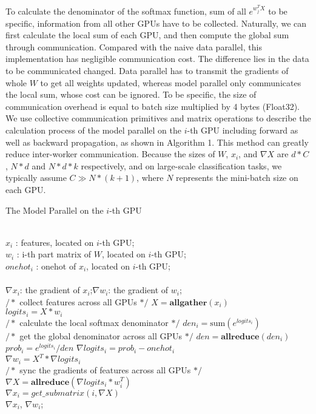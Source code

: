 \documentclass[letterpaper]{article} \usepackage{style/aaai21}  \usepackage{times}  \usepackage{helvet} \usepackage{courier}  \usepackage[hyphens]{url}  \usepackage{graphicx} \usepackage{color}
\begin{document}
To calculate the denominator of the softmax function, sum of all $e^{w_{j}^TX}$ to be specific, information from all other GPUs have to be collected. Naturally, we can first calculate the local sum of each GPU, and then compute the global sum through communication. Compared with the naive data parallel, this implementation has negligible communication cost. The difference lies in the data to be communicated changed. Data parallel has to transmit the gradients of whole $W$ to get all weights updated, whereas model parallel only communicates the local sum, whose cost can be ignored. To be specific, the size of communication overhead is equal to batch size multiplied by 4 bytes (Float32). We use collective communication primitives and matrix operations to describe the calculation process of the model parallel on the $i$-th GPU including forward as well as backward propagation, as shown in Algorithm 1. This method can greatly reduce inter-worker communication. Because the sizes of $W$, $x_i$, and $\nabla {X}$ are $d*C$, $N*d$ and $N*d*k$ respectively, and on large-scale classification tasks, we typically assume $C \gg N*(k+1)$, where $N$ represents the mini-batch size on each GPU.
\begin{algorithm}[t]
 \caption{The Model Parallel on the $i$-th GPU}
 \begin{algorithmic}[1]
  \REQUIRE ~~\\ 
  	{$ x_i$}  : features, located on $i$-th GPU;                \\
	{$ w_i$}  : i-th part matrix of $W$, located on $i$-th GPU;          \\
  	{$ onehot_i$}  : onehot of $x_i$, located on $i$-th GPU;   \\
  \ENSURE ~~\\ 
  	$\nabla {x_i}$: the gradient of $x_i$;\quad $\nabla {w_i}$: the gradient of $w_i$;\\
    \STATE $/*$ collect features across all GPUs $*/$
    \STATE $   {X} = \textbf{allgather}(x_i)$  \\
    \STATE $   {logits_i = X*w_{i}}$ \\  
    \STATE $/*$ calculate the local softmax denominator $*/$
    \STATE $   den_i = \text{sum} (e^{logits_i})$ \\  
    \STATE $/*$ get the global denominator across all GPUs $*/$
    \STATE $   den = \textbf{allreduce}(den_i)$\\ \STATE $   prob_i = e^{logits_i} / {den} $ 
    \STATE $   \nabla {logits_i} = prob_i-onehot_i$ \\
    \STATE $   \nabla {w_i} = X^T*\nabla {logits_i}$ \\ 
    \STATE $/*$ sync the gradients of features across all GPUs $*/$
    \STATE $  {\nabla {X}} = \textbf{allreduce}(\nabla {logits_i}*w_i^T)$ \\
    \STATE $   \nabla {x_i} = {get\_submatrix}(i,\nabla {X})$\\
    \RETURN $   \nabla {x_i} $, \quad $\nabla {w_i}$; 
  \end{algorithmic}
\end{algorithm}
\end{document}
